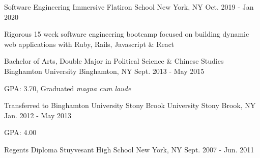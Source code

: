 
\begin{cventries}

  \cventry
    {Software Engineering Immersive} %
    {Flatiron School\vspace{-2.0mm}} %
    {New York, NY\vspace{-2.0mm}} %
    {Oct. 2019 - Jan 2020} %
    {
      \begin{cvitems} %
        \item {Rigorous 15 week software engineering bootcamp focused on building dynamic web applications with Ruby, Rails, Javascript \& React}
      \end{cvitems}
  }


  \cventry
    {Bachelor of Arts, Double Major in Political Science \& Chinese Studies} %
    {Binghamton University\vspace{-2.0mm}} %
    {Binghamton, NY\vspace{-2.0mm}} %
    {Sept. 2013 - May 2015} %
    {
      \begin{cvitems} %
        \item {GPA: 3.70, Graduated \textit{magna cum laude}}
      \end{cvitems}
    }

  \cventry
    {Transferred to Binghamton University} %
    {Stony Brook University\vspace{-2.0mm}} %
    {Stony Brook, NY\vspace{-2.0mm}} %
    {Jan. 2012 - May 2013} %
    {
      \begin{cvitems} %
        \item {GPA: 4.00}
      \end{cvitems}
    }

  \cventry
    {Regents Diploma} %
    {Stuyvesant High School\vspace{-2.0mm}} %
    {New York, NY\vspace{-2.0mm}} %
    {Sept. 2007 - Jun. 2011} %
    {
    }
    \vspace{-\baselineskip}



\end{cventries}
